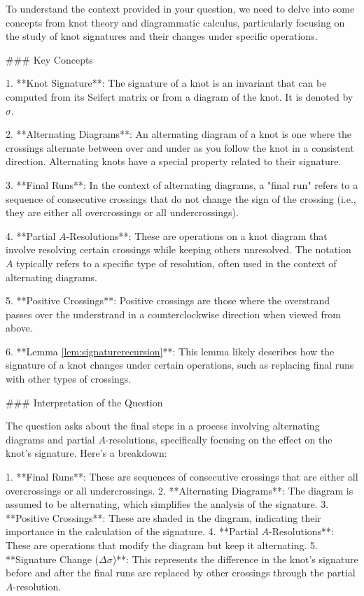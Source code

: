 To understand the context provided in your question, we need to delve into some concepts from knot theory and diagrammatic calculus, particularly focusing on the study of knot signatures and their changes under specific operations.

### Key Concepts

1. **Knot Signature**: The signature of a knot is an invariant that can be computed from its Seifert matrix or from a diagram of the knot. It is denoted by \(\sigma\).

2. **Alternating Diagrams**: An alternating diagram of a knot is one where the crossings alternate between over and under as you follow the knot in a consistent direction. Alternating knots have a special property related to their signature.

3. **Final Runs**: In the context of alternating diagrams, a "final run" refers to a sequence of consecutive crossings that do not change the sign of the crossing (i.e., they are either all overcrossings or all undercrossings).

4. **Partial \(A\)-Resolutions**: These are operations on a knot diagram that involve resolving certain crossings while keeping others unresolved. The notation \(A\) typically refers to a specific type of resolution, often used in the context of alternating diagrams.

5. **Positive Crossings**: Positive crossings are those where the overstrand passes over the understrand in a counterclockwise direction when viewed from above.

6. **Lemma \ref{lem:signaturerecursion}**: This lemma likely describes how the signature of a knot changes under certain operations, such as replacing final runs with other types of crossings.

### Interpretation of the Question

The question asks about the final steps in a process involving alternating diagrams and partial \(A\)-resolutions, specifically focusing on the effect on the knot's signature. Here’s a breakdown:

1. **Final Runs**: These are sequences of consecutive crossings that are either all overcrossings or all undercrossings.
2. **Alternating Diagrams**: The diagram is assumed to be alternating, which simplifies the analysis of the signature.
3. **Positive Crossings**: These are shaded in the diagram, indicating their importance in the calculation of the signature.
4. **Partial \(A\)-Resolutions**: These are operations that modify the diagram but keep it alternating.
5. **Signature Change (\(\Delta \sigma\))**: This represents the difference in the knot's signature before and after the final runs are replaced by other crossings through the partial \(A\)-resolution.

